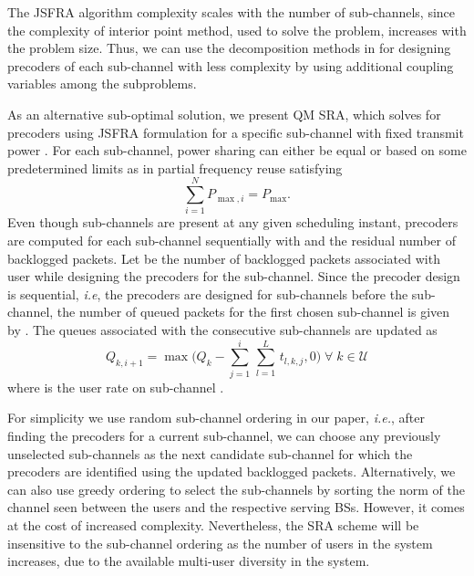 The \ac{JSFRA} algorithm complexity scales with the number of sub-channels, since the complexity of interior point method, used to solve the problem, increases with the problem size. Thus, we can use the decomposition methods in \cite{palomar2006tutorial,boyd2011distributed} for designing precoders of each sub-channel with less complexity by using additional coupling variables among the subproblems.

As an alternative sub-optimal solution, we present \acl{QM} \ac{SRA}, which solves for precoders using \ac{JSFRA} formulation for a specific sub-channel  with fixed transmit power . For each sub-channel, power sharing can either be equal or based on some predetermined limits as in partial frequency reuse satisfying
\begin{equation}
\sum_{i=1}^N P_{\max,i} = P_{\max}.
\end{equation}
Even though  sub-channels are present at any given scheduling instant, precoders are computed for each sub-channel sequentially with  and the residual number of backlogged packets. Let  be the number of backlogged packets associated with user  while designing the precoders for the  sub-channel. Since the precoder design is sequential, \textit{i.e}, the precoders are designed for sub-channels \me{[0,i-1]} before the  sub-channel, the number of queued packets for the first chosen sub-channel is given by . The queues associated with the consecutive sub-channels are updated as
\begin{equation}	\label{eqn-weight}
Q_{k,i+1} = \max \Big ( Q_k - \sum_{j = 1}^{i} \, \sum_{l = 1}^{L} \, t_{l,k,j} ,0 \Big ) \; \forall \; k \in \mathcal{U}
\end{equation}
where  is the  user rate on sub-channel . 

For simplicity we use random sub-channel ordering in our paper, \textit{i.e.}, after finding the precoders for a current sub-channel, we can choose any previously unselected sub-channels as the next candidate sub-channel for which the precoders are identified using the updated backlogged packets. Alternatively, we can also use greedy ordering to select the sub-channels by sorting the norm of the channel seen between the users and the respective serving \acp{BS}. However, it comes at the cost of increased complexity. Nevertheless, the \ac{SRA} scheme will be insensitive to the sub-channel ordering as the number of users in the system increases, due to the available multi-user diversity in the system.

